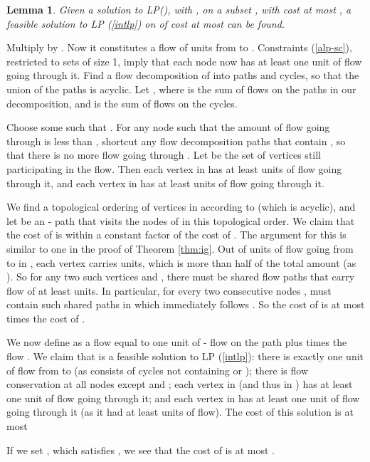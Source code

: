 \documentclass[11pt]{article}
\newcommand{\qed}{\hspace*{\fill}}
\newtheorem{lemma}[theorem]{Lemma}
\newenvironment{proof}[1][Proof. ]{\noindent {\bf #1 }}{\qed}
\begin{document}
\begin{lemma} \label{lem:tr}
Given a solution  to LP(), with , on a subset , with cost at most , a feasible solution to LP (\ref{intlp}) on  of cost at most  can be found.
\end{lemma}
\begin{proof}
Multiply  by . Now it constitutes a flow  of  units from  to . 
Constraints (\ref{alp-sc}), restricted to sets of size 1, imply that each node  now has at 
least one unit of flow going through it. Find a flow decomposition of  into paths and cycles, 
so that the union of the paths is acyclic. Let , where  is the sum of flows on 
the paths in our decomposition, and  is the sum of flows on the cycles. 

Choose some  such that . For any node  such that the 
amount of  flow going through  is less than , shortcut any flow decomposition 
paths that contain , so that there is no more  flow going through . Let  
be the set of vertices still participating in the  flow. Then each vertex in  has at least 
 units of  flow going through it, and each vertex in  has at least 
 units of  flow going through it.  

We find a topological ordering of vertices in  according to  (which is acyclic), and 
let  be an - path that visits the nodes of  in this topological order. We claim 
that the cost of  is within a constant factor of the cost of .
The argument for this is similar to one in the proof of Theorem \ref{thm:ig}.
Out of  units of flow 
going from  to  in , each vertex  carries  units, which is more than half of the total amount 
(as ). So for any two such vertices  and , there must be shared flow paths that carry flow of at least  units. 
In particular, for every 
two consecutive nodes ,  must contain such shared paths in which  immediately follows .  So the cost of  is at most  times the cost of .

We now define  as a flow equal to one unit of - flow on the path  plus 
 times the flow .  We claim that  is a feasible solution 
to LP (\ref{intlp}): there is exactly one unit of flow from  to  (as  consists of 
cycles not containing  or ); there is flow conservation at all nodes except  and ; 
each vertex in  (and thus in ) has at least one unit of flow going through it; and each 
vertex in  has at least one unit of flow going through it (as it had at least 
 units of  flow).  The cost of this solution is at most 

If we set , which satisfies , 
we see that the cost of  is at most .
\end{proof}
\end{document}
